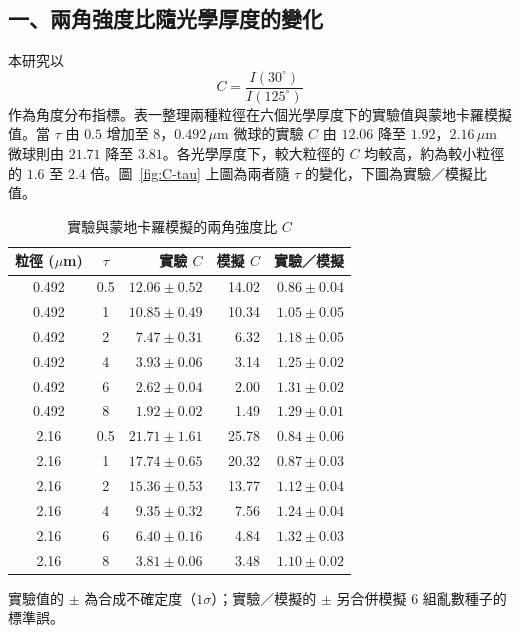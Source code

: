\subsection*{一、兩角強度比隨光學厚度的變化}
本研究以
\[
    C = \frac{I(30^\circ)}{I(125^\circ)}
\]
作為角度分布指標。表一整理兩種粒徑在六個光學厚度下的實驗值與蒙地卡羅模擬值。當 $\tau$ 由 $0.5$ 增加至 $8$，$0.492\,\mu\mathrm{m}$ 微球的實驗 $C$ 由 $12.06$ 降至 $1.92$，$2.16\,\mu\mathrm{m}$ 微球則由 $21.71$ 降至 $3.81$。各光學厚度下，較大粒徑的 $C$ 均較高，約為較小粒徑的 $1.6$ 至 $2.4$ 倍。圖~\ref{fig:C-tau} 上圖為兩者隨 $\tau$ 的變化，下圖為實驗／模擬比值。

\begin{table}[H]
    \centering
    \caption{實驗與蒙地卡羅模擬的兩角強度比 $C$}
    \label{tab:result-c}
    \small
    \renewcommand{\arraystretch}{1.2}
    \begin{tabular}{ccrrr}
        \toprule
        粒徑 ($\mu$m) & $\tau$ & 實驗 $C$ & 模擬 $C$ & 實驗／模擬 \\
        \midrule
        0.492 & 0.5 & $12.06 \pm 0.52$ & 14.02 & $0.86 \pm 0.04$ \\
        0.492 & 1   & $10.85 \pm 0.49$ & 10.34 & $1.05 \pm 0.05$ \\
        0.492 & 2   & $7.47 \pm 0.31$  & 6.32  & $1.18 \pm 0.05$ \\
        0.492 & 4   & $3.93 \pm 0.06$  & 3.14  & $1.25 \pm 0.02$ \\
        0.492 & 6   & $2.62 \pm 0.04$  & 2.00  & $1.31 \pm 0.02$ \\
        0.492 & 8   & $1.92 \pm 0.02$  & 1.49  & $1.29 \pm 0.01$ \\
        \midrule
        2.16  & 0.5 & $21.71 \pm 1.61$ & 25.78 & $0.84 \pm 0.06$ \\
        2.16  & 1   & $17.74 \pm 0.65$ & 20.32 & $0.87 \pm 0.03$ \\
        2.16  & 2   & $15.36 \pm 0.53$ & 13.77 & $1.12 \pm 0.04$ \\
        2.16  & 4   & $9.35 \pm 0.32$  & 7.56  & $1.24 \pm 0.04$ \\
        2.16  & 6   & $6.40 \pm 0.16$  & 4.84  & $1.32 \pm 0.03$ \\
        2.16  & 8   & $3.81 \pm 0.06$  & 3.48  & $1.10 \pm 0.02$ \\
        \bottomrule
    \end{tabular}

    \vspace{0.5ex}
    {\footnotesize 實驗值的 $\pm$ 為合成不確定度（$1\sigma$）；實驗／模擬的 $\pm$ 另合併模擬 $6$ 組亂數種子的標準誤。}
\end{table}

